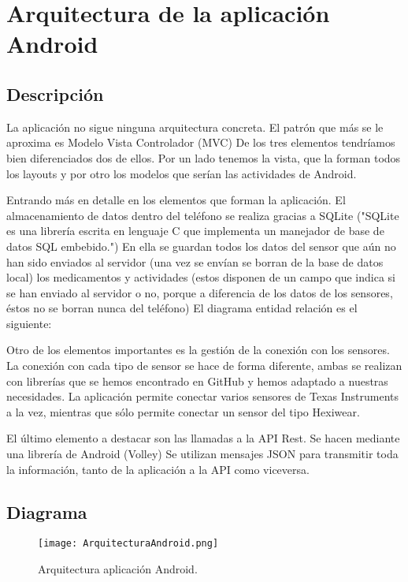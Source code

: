 \documentclass[11pt,spanish]{article}
\begin{document}
\section{Arquitectura de la aplicación Android}
\subsection{Descripción}
La aplicación no sigue ninguna arquitectura concreta. El patrón que más se le aproxima es Modelo Vista Controlador (MVC) De los tres elementos tendríamos bien diferenciados dos de ellos. Por un lado tenemos la vista, que la forman todos los layouts y por otro los modelos que serían las actividades de Android.
\newline

Entrando más en detalle en los elementos que forman la aplicación. El almacenamiento de datos dentro del teléfono se realiza gracias a SQLite ("SQLite es una librería escrita en lenguaje C que implementa un manejador de base de datos SQL embebido.") En ella se guardan todos los datos del sensor que aún no han sido enviados al servidor (una vez se envían se borran de la base de datos local) los medicamentos y actividades (estos disponen de un campo que indica si se han enviado al servidor o no, porque a diferencia de los datos de los sensores, éstos no se borran nunca del teléfono) El diagrama entidad relación es el siguiente:
\newline

Otro de los elementos importantes es la gestión de la conexión con los sensores. La conexión con cada tipo de sensor se hace de forma diferente, ambas se realizan con librerías que se hemos encontrado en GitHub y hemos adaptado a nuestras necesidades. La aplicación permite conectar varios sensores de Texas Instruments a la vez, mientras que sólo permite conectar un sensor del tipo Hexiwear.
\newline

El último elemento a destacar son las llamadas a la API Rest. Se hacen mediante una librería de Android (Volley) Se utilizan mensajes JSON para transmitir toda la información, tanto de la aplicación a la API como viceversa.

\subsection{Diagrama}
\begin{figure}[h!]
  \centering
  \texttt{[image: ArquitecturaAndroid.png]}
  \caption{Arquitectura aplicación Android.}
\end{figure}
\end{document}
